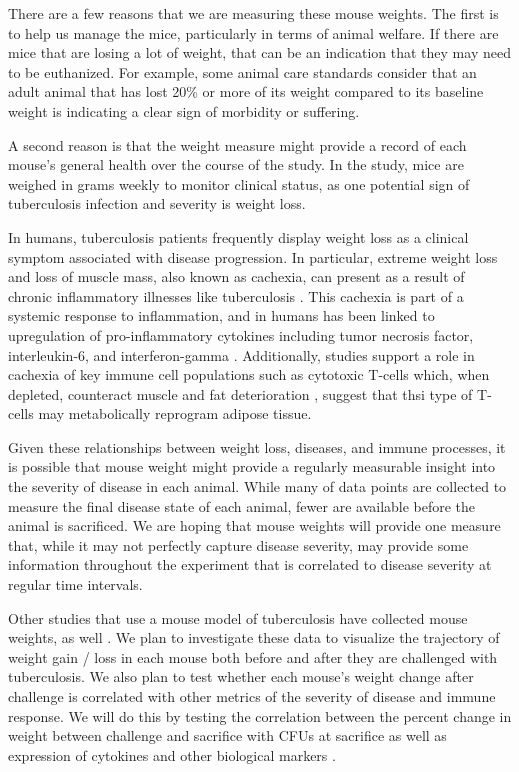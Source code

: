 \documentclass[
]{book}
\begin{document}
There are a few reasons that we are measuring these mouse weights. The first is
to help us manage the mice, particularly in terms of animal welfare. If there
are mice that are losing a lot of weight, that can be an indication that they
may need to be euthanized. For example, some animal care standards consider that
an adult animal that has lost 20\% or more of its weight compared to its baseline
weight is indicating a clear sign of morbidity or suffering.

A second reason is that the weight measure might provide a record of each
mouse's general health over the course of the study. In the study, mice are
weighed in grams weekly to monitor clinical status, as one potential sign of
tuberculosis infection and severity is weight loss.

In humans, tuberculosis patients frequently display weight loss as a clinical
symptom associated with disease progression. In particular, extreme weight loss
and loss of muscle mass, also known as cachexia, can present as a result of
chronic inflammatory illnesses like tuberculosis \citep{baazim2022interplay}. This
cachexia is part of a systemic response to inflammation, and in humans has been
linked to upregulation of pro-inflammatory cytokines including tumor necrosis
factor, interleukin-6, and interferon-gamma \citep{baazim2022interplay}.
Additionally, studies support a role in cachexia of key immune cell populations
such as cytotoxic T-cells which, when depleted, counteract muscle and fat
deterioration \citep{baazim2019cd8}, suggest that thsi type of T-cells may
metabolically reprogram adipose tissue.

Given these relationships between weight loss, diseases, and immune processes,
it is possible that mouse weight might provide a regularly measurable insight
into the severity of disease in each animal. While many of data points
are collected to measure the final disease state of each animal, fewer are
available before the animal is sacrificed. We are hoping that mouse weights
will provide one measure that, while it may not perfectly capture disease
severity, may provide some information throughout the experiment that is
correlated to disease severity at regular time intervals.

Other studies that use a mouse model of tuberculosis have collected mouse
weights, as well \citep{smith2022host, segueni2016controlled}. We plan to
investigate these data to visualize the trajectory of weight gain / loss in
each mouse both before and after they are challenged with tuberculosis.
We also plan to test whether each mouse's weight change after challenge
is correlated with other metrics of the severity of disease and immune response.
We will do this by testing the correlation between the percent change in
weight between challenge and sacrifice with CFUs at sacrifice as well as
expression of cytokines and other biological markers \citep{smith2022host}.
\end{document}
